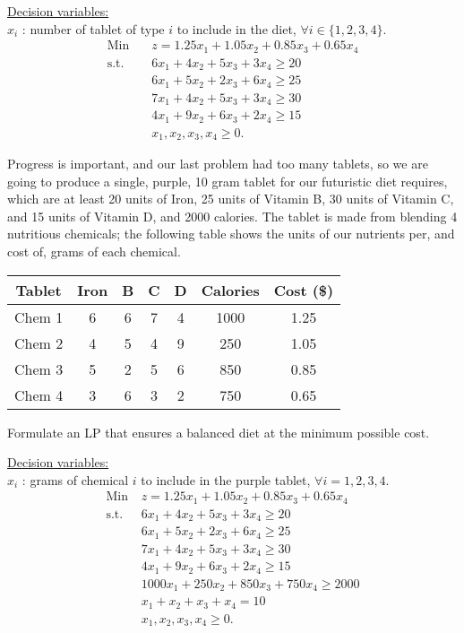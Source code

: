 \smallskip  \underline{Decision variables:} \\
$x_i$ : number of tablet of type $i$ to include in the diet, $\forall i \in \{1,2,3,4\}$.
\begin{align*}
\mbox{Min~~ } & z = 1.25x_1 + 1.05x_2 + 0.85x_3 + 0.65x_4 \\
\mbox{s.t.~~} &  6x_1 + 4x_2 + 5x_3 + 3x_4 \ge 20  \\
& 6x_1 + 5x_2 + 2x_3 + 6x_4 \ge 25 \\
& 7x_1 + 4x_2 + 5x_3 + 3x_4 \ge 30 \\
& 4x_1 + 9x_2 + 6x_3 + 2x_4 \ge 15  \\
& x_1, x_2, x_3, x_4 \ge 0. 
\end{align*}


 Progress is important, and our last problem had too many tablets, so we are going to produce a single, purple, 10 gram tablet for our futuristic diet requires, which are at least 20 units of Iron, 25 units of Vitamin B, 30 units of Vitamin C, and 15 units of Vitamin D, and 2000 calories. The tablet is made from blending 4 nutritious chemicals; the following table shows the units of our nutrients per, and cost of, grams of each chemical.
\begin{table}[h!] \begin{center} \begin{tabular} {|c|c|c|c|c|c|c|}
\hline Tablet  & Iron  &  B &  C &  D & Calories & Cost (\$) \\ \hline
\hline  Chem 1  & 6    & 6         & 7         & 4         &  1000    & 1.25 \\
\hline  Chem 2  & 4    & 5         & 4         & 9         &  250     & 1.05 \\
\hline  Chem 3  & 5    & 2         & 5         & 6         &  850     & 0.85 \\
\hline  Chem 4  & 3    & 6         & 3         & 2         &  750     & 0.65 \\
\hline
\end{tabular} \end{center} \end{table}
Formulate an LP that ensures a balanced diet at the minimum possible cost.

\smallskip \underline{Decision variables:} \\
$x_i$ : grams of chemical $i$ to include in the purple tablet, $\forall i = 1,2,3,4$.
\begin{align*}
\mbox{Min} & z = 1.25x_1 + 1.05x_2 + 0.85x_3 + 0.65x_4 \\
\mbox{s.t.~~} &  6x_1 + 4x_2 + 5x_3 + 3x_4 \ge 20 \\
& 6x_1 + 5x_2 + 2x_3 + 6x_4 \ge 25  \\
& 7x_1 + 4x_2 + 5x_3 + 3x_4 \ge 30  \\
& 4x_1 + 9x_2 + 6x_3 + 2x_4 \ge 15  \\
& 1000x_1 + 250x_2 + 850x_3 + 750x_4 \ge 2000 \\
& x_1 + x_2 + x_3 + x_4 = 10  \\
& x_1, x_2, x_3, x_4 \ge 0. 
\end{align*}

